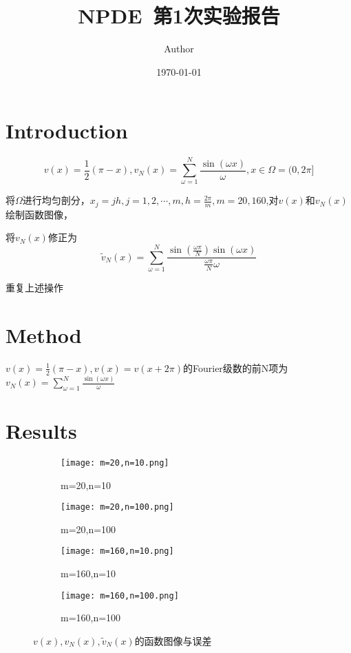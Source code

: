 \documentclass{article}
\title{NPDE~第1次实验报告}
\author{Author}
\date{\today}
\begin{document}
\maketitle

\section{Introduction}

$$v(x)=\frac{1}{2}(\pi-x),v_N(x)=\sum_{\omega =1}^{N}\frac{\sin(\omega x)}{\omega},x \in \Omega=(0,2\pi]$$

将$\Omega$进行均匀剖分，$x_j=jh,j=1,2,\cdots,m,h=\frac{2\pi}{m},m=20,160$,对$v(x)$和$v_N(x)$绘制函数图像，

将$v_N(x)$修正为$$\widetilde{v}_N(x)=\sum_{\omega =1}^{N}\frac{\sin(\frac{\omega \pi}{N})\sin(\omega x)}{\frac{\omega \pi}{N}\omega} $$

重复上述操作

\section{Method}

$v(x)=\frac{1}{2}(\pi-x),v(x)=v(x+2\pi)$的Fourier级数的前N项为$v_N(x)=\sum_{\omega =1}^{N}\frac{\sin(\omega x)}{\omega}$


\section{Results}

\begin{figure}[H]
    \centering
    \begin{subfigure}{0.35\textwidth}
        \texttt{[image: m=20,n=10.png]}
        \caption{m=20,n=10}
    \end{subfigure}
    \begin{subfigure}{0.35\textwidth}
        \texttt{[image: m=20,n=100.png]}
        \caption{m=20,n=100}
    \end{subfigure}
    \begin{subfigure}{0.35\textwidth}
        \texttt{[image: m=160,n=10.png]}
        \caption{m=160,n=10}
    \end{subfigure}
    \begin{subfigure}{0.35\textwidth}
        \texttt{[image: m=160,n=100.png]}
        \caption{m=160,n=100}
    \end{subfigure}
    \caption{$v(x),v_N(x),\widetilde{v}_N(x)$的函数图像与误差}
\end{figure}
\end{document}
